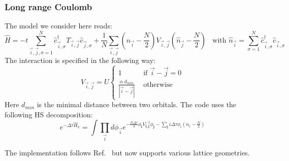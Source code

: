 \subsubsection{  Long range Coulomb }

The model we consider here reads: 
\begin{equation}
	\hat{H}  = -t \sum_{\vec{i},\vec{j},\sigma=1}^{N}   \hat{c}^{\dagger}_{\vec{i},\sigma}  T_{\vec{i},\vec{j}} \hat{c}^{}_{\vec{j},\sigma}   +     
	\frac{1} { N } \sum_{\vec{i},\vec{j}}  \left(  \hat{n}_{\vec{i}} -  \frac{N}{2}  \right)  V_{\vec{i},\vec{j}} \left(  \hat{n}_{\vec{j}} -  \frac{N}{2}  \right) \; \; 
	\text{ with }  \hat{n}_{\vec{i}} = \sum_{\sigma=1}^{N}  \hat{c}^{\dagger}_{\vec{i},\sigma}  \hat{c}^{}_{\vec{i},\sigma}
\end{equation}
The interaction is specified in the following way: 
\begin{equation}
	V_{\vec{i}, \vec{j}}   =   U \left\{
	\begin{array}{ll}  
	1          &   \text{ if } \vec{i} - \vec{j}    = 0 \\
	\frac{\alpha   \;   d_{min}}{ |   \vec{i} - \vec{j} | } &     \text{ otherwise }
	\end{array}
\right.
\end{equation}
Here $d_{min}$ is the minimal distance between two orbitals.     The code uses the following  HS decomposition:
\begin{equation}
e^{-\Delta \tau \hat{H}_V }  =  \int \prod_{\vec{i}} d \phi_{\vec{i}}   e^{ - \frac{N \Delta \tau} {4} \phi_{\pmb{i}} V^{-1}_{\pmb{i},\pmb{j}}  \phi_{\pmb{j}} - \sum_{\pmb{i}}  i \Delta \tau \phi_i \left( n_{i} - \frac{N}{2} \right) } 
\end{equation}

The implementation follows Ref.~\cite{Hohenadler14}  but now supports various lattice geometries. 
